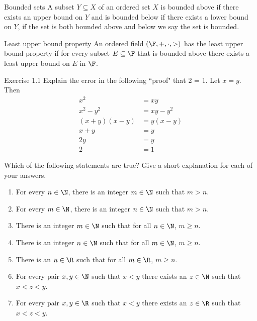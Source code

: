 \documentclass{report}
\begin{document}
\begin{definition}{Bounded sets}{}
  A subset $Y \subseteq X$ of an ordered set $X$
  is bounded above if there exists an upper bound on $Y$
  and is bounded below if there exists a lower bound on $Y$,
  if the set is both bounded above and below we say the set is bounded.
\end{definition}

\begin{definition}{Least upper bound property}{}
  An ordered field $\left(\F, +, \cdot, >\right)$ has the least upper bound property if
  for every subset $E \subseteq \F$ that is bounded above there exists a least upper bound on $E$ in $\F$.
\end{definition}

\begin{problem}{Exercise 1.1}{}
Explain the error in the following ``proof" that 2 = 1.
Let $x = y.$ Then
\begin{align}
  x^2            & = xy       \\
  x^2 - y^2      & = xy - y^2 \\
  (x + y)(x - y) & = y(x - y) \\
  x + y          & = y        \\
  2y             & = y        \\
  2              & = 1
\end{align}
\end{problem}

\begin{problem}{}{}
Which of the following statements are true? Give a short explanation for each of your answers.
\begin{enumerate}[label=(\alph*)]
  \item For every $n \in \N$, there is an integer $m \in \N$ such that $m > n$.
  \item For every $m \in \N$, there is an integer $n \in \N$ such that $m > n$.
  \item There is an integer $m \in \N$ such that for all $n \in \N$, $m \geq n$.
  \item There is an integer $n \in \N$ such that for all $m \in \N$, $m \geq n$.
  \item There is an $n \in \R$ such that for all $m \in \R$, $m \geq n$.
  \item For every pair $x, y \in \N$ such that $x < y$ there exists an $z \in \N$ such that $x < z < y$.
  \item For every pair $x, y \in \R$ such that $x < y$ there exists an $z \in \R$ such that $x < z < y$.
\end{enumerate}

\end{problem}
\end{document}
